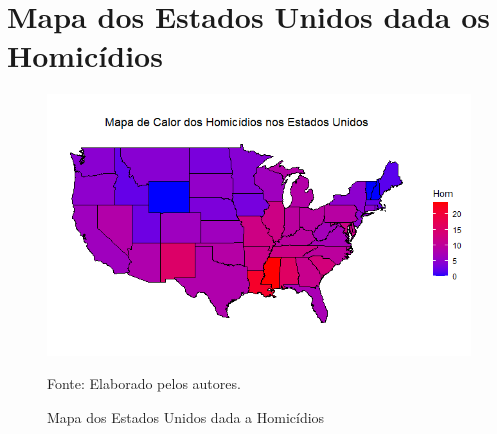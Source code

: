 \documentclass[12pt]{article}
\begin{document}
\section{\textbf{Mapa dos Estados Unidos dada os Homicídios}}
\begin{figure}[H]
    \centering
    \caption{Mapa dos Estados Unidos dada a Homicídios}
    \includegraphics[width=1.0\textwidth]{image.png}
    \label{fig:Mapa dos Estados Unidos dada a Homicídios}
    
    \footnotesize{Fonte: Elaborado pelos autores.}
\end{figure}
\end{document}
